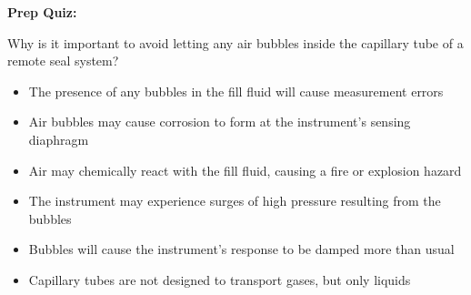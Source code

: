\vfil \eject

\noindent
{\bf Prep Quiz:}

Why is it important to avoid letting any air bubbles inside the capillary tube of a remote seal system?

\begin{itemize}
\item{} The presence of any bubbles in the fill fluid will cause measurement errors
\vskip 5pt 
\item{} Air bubbles may cause corrosion to form at the instrument's sensing diaphragm
\vskip 5pt 
\item{} Air may chemically react with the fill fluid, causing a fire or explosion hazard
\vskip 5pt 
\item{} The instrument may experience surges of high pressure resulting from the bubbles
\vskip 5pt 
\item{} Bubbles will cause the instrument's response to be damped more than usual
\vskip 5pt 
\item{} Capillary tubes are not designed to transport gases, but only liquids
\end{itemize}






